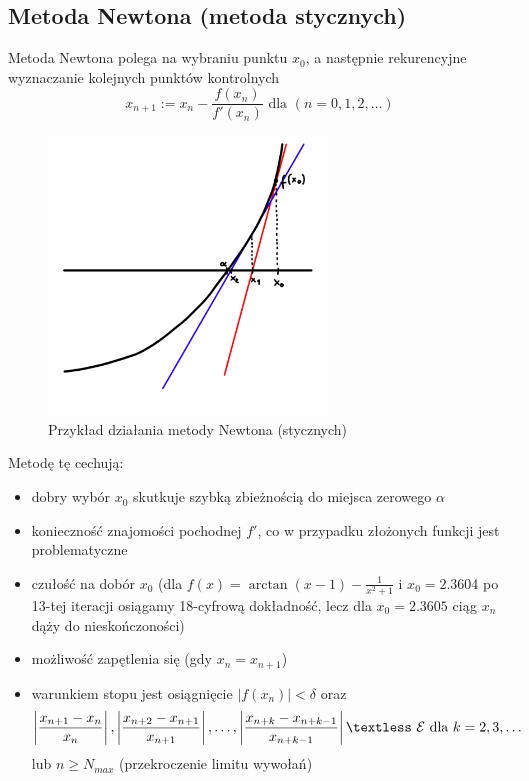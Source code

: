 \documentclass[a4paper,11pt]{article}
\begin{document}
\subsection{Metoda Newtona (metoda stycznych)}
Metoda Newtona polega na wybraniu punktu $x_0$, a następnie rekurencyjne wyznaczanie kolejnych punktów kontrolnych
$$ x_{n+1} := x_n - \frac{f(x_n)}{f'(x_n)} \text{ dla } (n=0,1,2,\ldots) $$

\begin{figure}[H]
\centering
\includegraphics[width=0.66\textwidth]{metodastycznych.png}
\caption{Przykład działania metody Newtona (stycznych)}
\label{metodastycznych}
\end{figure}

Metodę tę cechują:
\begin{itemize}
\item dobry wybór $x_0$ skutkuje szybką zbieżnością do miejsca zerowego $\alpha$
\item konieczność znajomości pochodnej $f'$, co w przypadku złożonych funkcji jest problematyczne
\item czułość na dobór $x_0$ (dla $f(x)=\arctan(x-1)-\frac{1}{x^2+1}$ i $x_0=2.3604$ po 13-tej iteracji osiągamy 18-cyfrową dokładność, lecz dla $x_0=2.3605$ ciąg $x_n$ dąży do nieskończoności)
\item możliwość zapętlenia się (gdy $x_n = x_{n+1}$)
\item warunkiem stopu jest osiągnięcie $|f(x_n)| < \delta$ oraz
$$ \left| \frac{x_{n+1}-x_{n}}{x_{n}} \right|, \left| \frac{x_{n+2}-x_{n+1}}{x_{n+1}} \right|, \ldots, \left| \frac{x_{n+k}-x_{n+k-1}}{x_{n+k-1}} \right| \textless \ \mathcal{E} \text{ dla } k=2,3,\ldots $$
lub $n \geq N_{max}$ (przekroczenie limitu wywołań)
\end{itemize}
\end{document}
